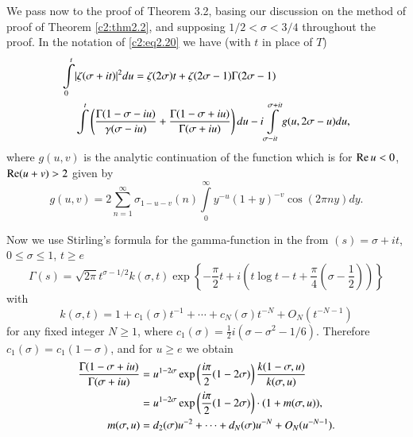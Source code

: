 We pass now to the proof of Theorem 3.2, basing our discussion on the
method of proof of Theorem \ref{c2:thm2.2}, and supposing $1/2 <
\sigma < 3/4$ throughout the proof. In the notation of
\eqref{c2:eq2.20} we have (with $t$ in place of $T$)
{\fontsize{10pt}{12pt}\selectfont
\begin{align}
  \int\limits_0^t & |\zeta (\sigma + it)|^2 du  = \zeta(2 \sigma)t +
  \zeta (2 \sigma-1) \Gamma (2 \sigma-1)\notag\\ 
  & \int\limits^t
  \left(\frac{\Gamma (1- \sigma - iu)}{\gamma (\sigma - iu)} +
  \frac{\Gamma (1- \sigma + iu)}{\Gamma (\sigma + iu)} \right)du
   - i \int\limits_{\sigma- it}^{\sigma+ it} g(u, 2 \sigma - u)
  du,\label{c3:eq3.18} 
\end{align}}
where $g(u, v)$ is the analytic continuation of the function which is
for $\operatorname{Re} u < 0$, $\operatorname{Re} (u+v)> 2$ given by 
$$
g(u, v) = 2 \sum_{n=1}^\infty \sigma_{1-u-v} (n) \int\limits_0^\infty
y^{-u} (1+ y)^{-v} \cos (2 \pi ny)dy.
$$

Now we use Stirling's formula for the gamma-function in the from $(s)=
\sigma + it$, $0 \leq \sigma \leq 1$, $t \geq e$
$$
\Gamma (s) = \sqrt{2 \pi} t^{\sigma- 1/2} k(\sigma, t) \exp \left\{-
\frac{\pi}{2} t + i \left(t \log t -t + \frac{\pi}{4} \left(\sigma-
\frac{1}{2}  \right)\right) \right\}
$$ 
with
$$
k(\sigma, t)= 1 + c_1 (\sigma) t^{-1} + \cdots + c_N (\sigma) t^{-N} +
O_N (t^{-N-1})
$$
for any fixed integer $N\geq 1$, where $c_1 (\sigma)= \frac{1}{2} i (\sigma -
\sigma^2 - 1/6)$. Therefore $c_1 (\sigma) = c_1 (1- \sigma)$, and for
$u\geq e$ we obtain 
\begin{align}
  \frac{\Gamma(1- \sigma + iu)}{\Gamma (\sigma + iu)} & = u^{1-2\sigma}
  \exp \left( \frac{i\pi}{2}(1- 2 \sigma)\right) \frac{k(1- \sigma , u)}{k(\sigma,
    u)}\notag\\
  & = u^{1- 2\sigma} \exp \left(\frac{i\pi}{2} (1- 2 \sigma) \right)
  \cdot (1+ m (\sigma, u)),\label{c3:eq3.19}\\
  m(\sigma, u)& = d_2 (\sigma) u^{-2} + \cdots + d_N (\sigma) u^{-N} +
  O_N (u^{-N-1}).\notag 
\end{align}

